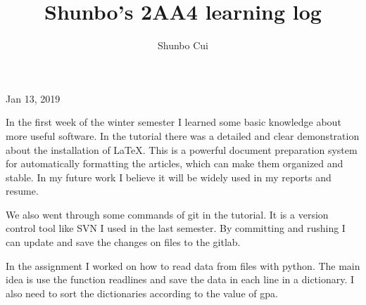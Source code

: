 \documentclass{article}
\title{Shunbo's 2AA4 learning log}
\author{Shunbo Cui}
\date{}
\begin{document}
\maketitle

\begin{flushleft}
Jan 13, 2019
\end{flushleft}
\par
In the first week of the winter semester I learned some basic knowledge about more useful software. In the tutorial there was a detailed and clear demonstration about the installation of LaTeX. This is a powerful document preparation system for automatically formatting the articles, which can make them organized and stable. In my future work I believe it will be widely used in my reports and resume.  \par
We also went through some commands of git in the tutorial. It is a version control tool like SVN I used in the last semester. By committing and rushing I can update and save the changes on files to the gitlab.\par
In the assignment I worked on how to read data from files with python. The main idea is use the function readlines and save the data in each line in a dictionary. I also need to sort the dictionaries according to the value of gpa.
\end{document}
